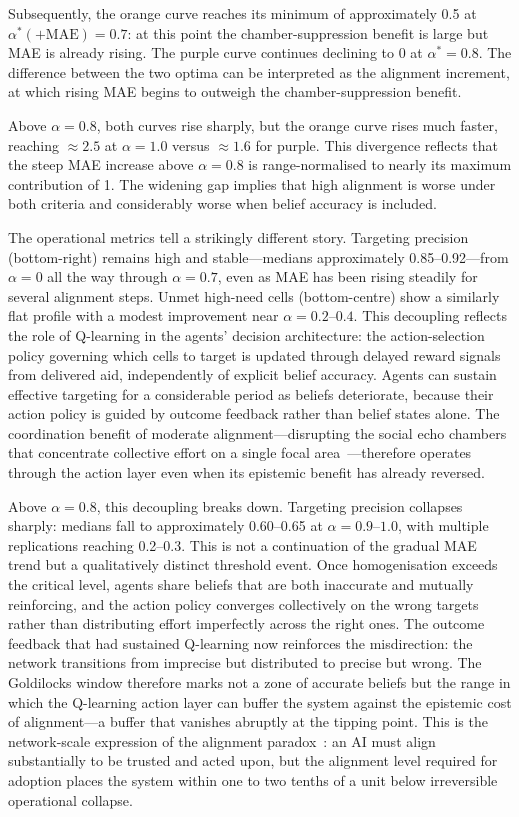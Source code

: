 \documentclass[pdflatex,sn-apa]{sn-jnl}%
\begin{document}
Subsequently, the orange curve reaches its minimum of approximately 0.5 at $\alpha^{*}(+\mathrm{MAE}) = 0.7$: at this point the chamber-suppression benefit is large but MAE is already rising. The purple curve continues declining to 0 at $\alpha^{*} = 0.8$. The difference between the two optima can be interpreted as the alignment increment, at which rising MAE begins to outweigh the chamber-suppression benefit.

Above $\alpha = 0.8$, both curves rise sharply, but
the orange curve rises much faster, reaching
$\approx 2.5$ at $\alpha = 1.0$ versus $\approx 1.6$
for purple. This divergence reflects that the steep
MAE increase above $\alpha = 0.8$ is range-normalised
to nearly its maximum contribution of 1. The widening
gap implies that high alignment is worse under both criteria and considerably worse when belief accuracy is included.

The operational metrics tell a strikingly different
story. Targeting precision (bottom-right) remains high
and stable---medians approximately 0.85--0.92---from
$\alpha = 0$ all the way through $\alpha = 0.7$,
even as MAE has been rising steadily for several
alignment steps. Unmet high-need cells (bottom-centre)
show a similarly flat profile with a modest improvement
near $\alpha = 0.2$--$0.4$. This decoupling reflects the
role of Q-learning in the agents' decision architecture:
the action-selection policy governing which cells to
target is updated through delayed reward signals from
delivered aid, independently of explicit belief
accuracy. Agents can sustain effective targeting for
a considerable period as beliefs deteriorate, because
their action policy is guided by outcome feedback
rather than belief states alone. The coordination
benefit of moderate alignment---disrupting the social
echo chambers that concentrate collective effort on a
single focal area~\citep{comes2020}---therefore operates
through the action layer even when its epistemic benefit
has already reversed.
 
Above $\alpha = 0.8$, this decoupling breaks down.
Targeting precision collapses sharply: medians fall
to approximately 0.60--0.65 at $\alpha = 0.9$--$1.0$,
with multiple replications reaching 0.2--0.3. This is
not a continuation of the gradual MAE trend but a
qualitatively distinct threshold event. Once
homogenisation exceeds the critical level, agents
share beliefs that are both inaccurate and mutually
reinforcing, and the action policy converges
collectively on the wrong targets rather than
distributing effort imperfectly across the right
ones. The outcome feedback that had sustained
Q-learning now reinforces the misdirection: the
network transitions from imprecise but distributed
to precise but wrong. The Goldilocks window therefore
marks not a zone of accurate beliefs but the range
in which the Q-learning action layer can buffer the
system against the epistemic cost of alignment---a
buffer that vanishes abruptly at the tipping point.
This is the network-scale expression of the alignment
paradox~\citep{WestAydin2025}: an AI must align
substantially to be trusted and acted upon, but the
alignment level required for adoption places the
system within one to two tenths of a unit below
irreversible operational collapse.
 
\end{document}
